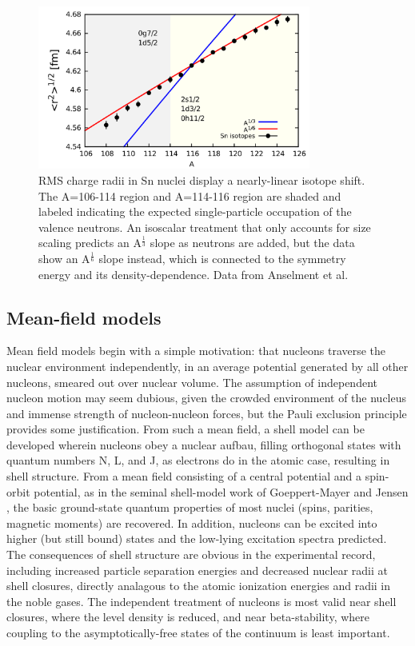 \begin{figure}
    \centering
    \includegraphics[width=0.8\textwidth]{figures/SnIsotopeRMSRadii.png}
    \caption{RMS charge radii in Sn nuclei display a nearly-linear isotope
    shift. The A=106-114 region and A=114-116 region are shaded and labeled
    indicating the expected single-particle occupation of the valence neutrons.
    An isoscalar treatment that only accounts for size scaling predicts an
    A$^{\frac{1}{3}}$ slope as neutrons are added, but the data show an
A$^{\frac{1}{6}}$ slope instead, which is connected to the symmetry energy
and its density-dependence. Data from Anselment et al. \cite{Anselment1986}}
    \label{SnIsotopeShift}
\end{figure}

\subsection{Mean-field models}
Mean field models begin with a simple motivation: that nucleons
traverse the nuclear environment independently, in an average
potential generated by all other nucleons, smeared out over nuclear volume.
The assumption of independent nucleon motion may seem dubious, given the
crowded environment of the nucleus and immense strength of nucleon-nucleon forces,
but the Pauli exclusion principle provides some justification.
From such a mean field, a shell model can be developed wherein nucleons obey a nuclear aufbau, 
filling orthogonal states with quantum numbers N, L, and J, as electrons do in the atomic 
case, resulting in shell structure. From a mean field consisting of a central
potential and a spin-orbit potential, as in the seminal shell-model work of Goeppert-Mayer
and Jensen \cite{GoeppertMayer1955}, the basic ground-state quantum properties of most nuclei
(spins, parities, magnetic moments) are recovered. In addition, nucleons can be
excited into higher (but still bound) states and the low-lying excitation
spectra predicted. The consequences of shell structure are obvious
in the experimental record, including increased particle separation 
energies and decreased nuclear radii at shell closures, directly analagous to
the atomic ionization energies and radii in the noble gases. The independent
treatment of nucleons is most valid near shell closures,
where the level density is reduced, and near beta-stability, where coupling to
the asymptotically-free states of the continuum is least important.

